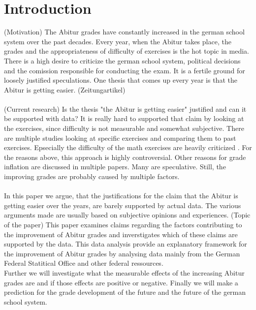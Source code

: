 \section{Introduction}
(Motivation)
The Abitur grades have constantly increased in the german school system over the past decades. Every year, when the Abitur takes place, the grades and the appropriateness of difficulty of exercises is the hot topic in media. \\
There is a high desire to criticize the german school system, political decisions and the comission responsible for conducting the exam. It is a fertile ground for loosely justified speculations. One thesis that comes up every year is that the Abitur is getting easier. (Zeitungartikel)\\\\
(Current research)
Is the thesis "the Abitur is getting easier" justified and can it be supported with data? It is really hard to supported that claim by looking at the exercises, since difficulty is not measurable and somewhat subjective. There are multiple studies looking at specific exercises and comparing them to past exercises. Epsecially the difficulty of the math exercises are heavily criticized \cite{kuhnel2015modellierungskompetenz} \cite{JahnkeKleinKühnelSonarSpindler+2014+115+122} \cite{lemmermeyer2019zentralabitur}. For the reasons above, this approach is highly controversial. Other reasons for grade inflation are discussed in multiple papers. Many are speculative. Still, the improving grades are probably caused by multiple factors.\\\\
In this paper we argue, that the justifications for the claim that the Abitur is getting easier over the years, are barely supported by actual data. The various arguments made are usually based on subjective opinions and experiences.
(Topic of the paper)
This paper examines claims regarding the factors contributing to the improvement of Abitur grades and inverstigates which of these claims are supported by the data. This data analysis provide an explanatory framework for the improvement of Abitur grades by analysing data mainly from the German Federal Statitical Office and other federal ressources.\\
Further we will investigate what the measurable effects of the increasing Abitur grades are and if those effects are positive or negative. Finally we will make a prediction for the grade development of the future and the future of the german school system.
